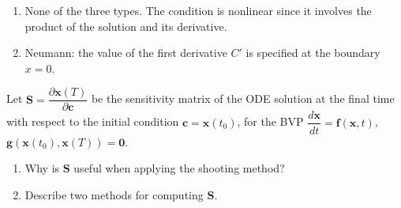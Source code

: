 \begin{solution}
    \begin{enumerate}[label=(\alph*)]
        \item None of the three types. The condition is nonlinear since it involves the product of the solution and its derivative.
        \item Neumann: the value of the first derivative $C'$ is specified at the boundary $x = 0$.
    \end{enumerate}
\end{solution}

%
%     

\begin{exercise} %
    Let $\mathbf{S} = \dfrac{\partial\mathbf{x}(T)}{\partial\mathbf{c}}$ be the sensitivity matrix of the ODE solution at the final time with respect to the initial condition $\mathbf{c} = \mathbf{x}(t_0)$, for the BVP $\dfrac{d\mathbf{x}}{dt} = \mathbf{f}(\mathbf{x},t)$, $\mathbf{g}(\mathbf{x}(t_0), \mathbf{x}(T)) = \mathbf{0}$.
    \begin{enumerate}[label=(\alph*)]
        \item Why is $\mathbf{S}$ useful when applying the shooting method?
        \item Describe two methods for computing $\mathbf{S}$.
    \end{enumerate}
\end{exercise}

